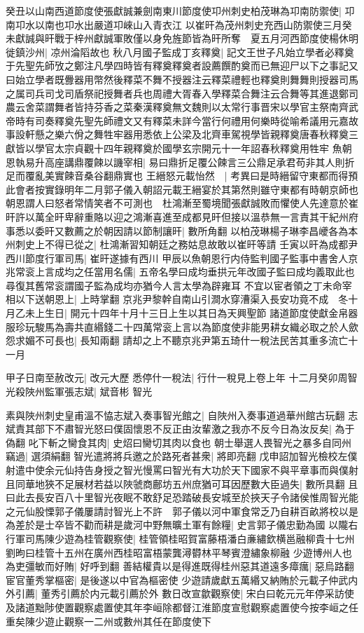 癸丑以山南西道節度使張獻誠兼劍南東川節度使卭州刺史柏茂琳為卭南防禦使|{
	卭南卭水以南也卭水出嚴道卭崍山入青衣江}
以崔旰為茂州刺史充西山防禦使三月癸未獻誠與旰戰于梓州獻誠軍敗僅以身免旌節皆為旰所奪　夏五月河西節度使楊休明徙鎮沙州|{
	凉州淪䧟故也}
秋八月國子監成丁亥釋奠|{
	記文王世子凡始立學者必釋奠于先聖先師攷之鄭注凡學四時皆有釋奠釋奠者設薦饌酌奠而已無迎尸以下之事記又曰始立學者既釁器用幣然後釋菜不舞不授器注云釋菜禮輕也釋奠則舞舞則授器司馬之属司兵司戈司盾祭祀授舞者兵也周禮大胥春入學釋菜合舞注云合舞等其進退鄭司農云舍菜謂舞者皆持芬香之菜秦漢釋奠無文魏則以太常行事晋宋以學官主祭南齊武帝時有司奏釋奠先聖先師禮文又有釋菜未詳今當行何禮用何樂時從喻希議用元嘉故事設軒懸之樂六佾之舞牲牢器用悉依上公梁及北齊車駕視學皆親釋奠唐春秋釋奠三獻皆以學官太宗貞觀十四年親釋奠於國學玄宗開元十一年詔春秋釋奠用牲牢}
魚朝恩執易升高座講鼎覆餗以譏宰相|{
	易曰鼎折足覆公餗言三公鼎足承君苟非其人則折足而覆亂美實餗音桑谷翻鼎實也}
王縉怒元載怡然　|{
	考異曰是時縉留守東都而得預此會者按實錄明年二月郭子儀入朝詔元載王縉宴於其第然則雖守東都有時朝京師也}
朝恩謂人曰怒者常情笑者不可測也　杜鴻漸至蜀境聞張獻誠敗而懼使人先達意於崔旰許以萬全旰卑辭重賂以迎之鴻漸喜進至成都見旰但接以溫恭無一言責其干紀州府事悉以委旰又數薦之於朝因請以節制讓旰|{
	數所角翻}
以柏茂琳楊子琳李昌巙各為本州刺史上不得已從之|{
	杜鴻漸習知朝廷之務姑息故敢以崔旰等請}
壬寅以旰為成都尹西川節度行軍司馬|{
	崔旰遂據有西川}
甲辰以魚朝恩行内侍監判國子監事中書舍人京兆常衮上言成均之任當用名儒|{
	五帝名學曰成均垂拱元年改國子監曰成均義取此也尋復其舊常衮謂國子監為成均亦猶今人言太學為辟雍耳}
不宜以宦者領之丁未命宰相以下送朝恩上|{
	上時掌翻}
京兆尹黎幹自南山引澗水穿漕渠入長安功竟不成　冬十月乙未上生日|{
	開元十四年十月十三日上生以其日為天興聖節}
諸道節度使獻金帛器服珍玩駿馬為壽共直緡錢二十四萬常衮上言以為節度使非能男耕女織必取之於人歛怨求媚不可長也|{
	長知兩翻}
請却之上不聽京兆尹第五琦什一稅法民苦其重多流亡十一月

甲子日南至赦改元|{
	改元大歷}
悉停什一稅法|{
	行什一稅見上卷上年}
十二月癸卯周智光殺陜州監軍張志斌|{
	斌音彬}
智光

素與陜州刺史皇甫溫不恊志斌入奏事智光館之|{
	自陜州入奏事道過華州館古玩翻}
志斌責其部下不肅智光怒曰僕固懷恩不反正由汝輩激之我亦不反今日為汝反矣|{
	為于偽翻}
叱下斬之臠食其肉|{
	史炤曰臠切其肉以食也}
朝士舉選人畏智光之暴多自同州竊過|{
	選須絹翻}
智光遣將將兵邀之於路死者甚衆|{
	將即亮翻}
戊申詔加智光檢校左僕射遣中使余元仙持告身授之智光慢罵曰智光有大功於天下國家不與平章事而與僕射且同華地狹不足展材若益以陜虢商鄜坊五州庶猶可耳因歷數大臣過失|{
	數所具翻}
且曰此去長安百八十里智光夜眠不敢舒足恐踏破長安城至於挾天子令諸侯惟周智光能之元仙股慄郭子儀屢請討智光上不許　郭子儀以河中軍食常乏乃自耕百畝將校以是為差於是士卒皆不勸而耕是歲河中野無曠土軍有餘糧|{
	史言郭子儀忠勤為國}
以隴右行軍司馬陳少遊為桂管觀察使|{
	桂管領桂昭賀富藤梧潘白亷繡欽横邕融柳貴十七州劉昫曰桂管十五州在廣州西桂昭富梧蒙龔潯欎林平琴賓澄繡象柳融}
少遊博州人也為吏彊敏而好賄|{
	好呼到翻}
善結權貴以是得進既得桂州惡其道遠多瘴癘|{
	惡烏路翻}
宦官董秀掌樞密|{
	是後遂以中官為樞密使}
少遊請歲獻五萬緡又納賄於元載子仲武内外引薦|{
	董秀引薦於内元載引薦於外}
數日改宣歙觀察使|{
	宋白曰乾元元年停采訪使及諸道黜陟使置觀察處置使其年李峘除都督江淮節度宣慰觀察處置使今按李峘之任重矣陳少遊止觀察一二州或數州其任在節度使下}


